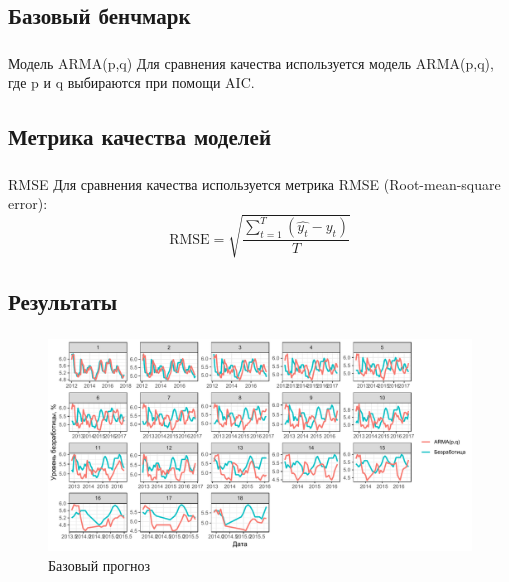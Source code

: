 \documentclass[c, dvipsnames]{beamer}  %
\begin{document}
\subsection{Базовый бенчмарк}
\begin{frame}
\frametitle{\insertsection} 
\framesubtitle{\insertsubsection}
    \begin{block}{Модель ARMA(p,q)}
Для сравнения качества используется модель ARMA(p,q), где p и q выбираются при помощи AIC.
    \end{block}
 \end{frame}   
 

 \subsection{Метрика качества моделей}
\begin{frame}
\frametitle{\insertsection} 
\framesubtitle{\insertsubsection}
    \begin{block}{RMSE}
Для сравнения качества используется метрика RMSE (Root-mean-square error):
\begin{equation}
   \text{RMSE} = \sqrt{ \frac{\sum_{t = 1}^{T} (\hat{y_t} - y_t)}{T}} 
\end{equation}

    \end{block}
 \end{frame}  

\subsection{Результаты}


\begin{frame}
\frametitle{\insertsection} 
\framesubtitle{\insertsubsection}
\begin{figure}
\caption{Базовый прогноз}
\includegraphics[width=\linewidth]{arma.pdf}
\end{figure}
\end{frame}
\end{document}
